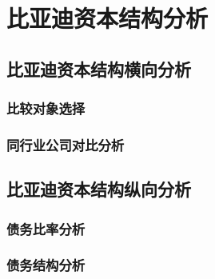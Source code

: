 \chapter{比亚迪资本结构分析}












\section{比亚迪资本结构横向分析}


\subsection{比较对象选择}


\subsection{同行业公司对比分析}


\section{比亚迪资本结构纵向分析}


\subsection{债务比率分析}


\subsection{债务结构分析}


